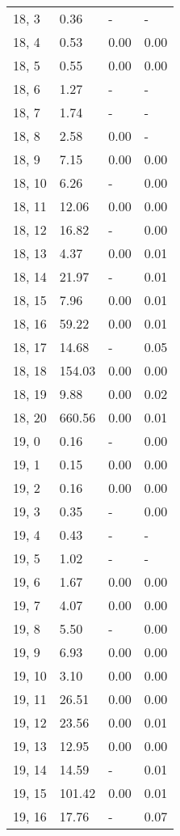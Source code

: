 \begin{table}
\begin{tabular}{llll}
18, 3  &    0.36 &     - &     - \\
18, 4  &    0.53 &  0.00 &  0.00 \\
18, 5  &    0.55 &  0.00 &  0.00 \\
18, 6  &    1.27 &     - &     - \\
18, 7  &    1.74 &     - &     - \\
18, 8  &    2.58 &  0.00 &     - \\
18, 9  &    7.15 &  0.00 &  0.00 \\
18, 10 &    6.26 &     - &  0.00 \\
18, 11 &   12.06 &  0.00 &  0.00 \\
18, 12 &   16.82 &     - &  0.00 \\
18, 13 &    4.37 &  0.00 &  0.01 \\
18, 14 &   21.97 &     - &  0.01 \\
18, 15 &    7.96 &  0.00 &  0.01 \\
18, 16 &   59.22 &  0.00 &  0.01 \\
18, 17 &   14.68 &     - &  0.05 \\
18, 18 &  154.03 &  0.00 &  0.00 \\
18, 19 &    9.88 &  0.00 &  0.02 \\
18, 20 &  660.56 &  0.00 &  0.01 \\
19, 0  &    0.16 &     - &  0.00 \\
19, 1  &    0.15 &  0.00 &  0.00 \\
19, 2  &    0.16 &  0.00 &  0.00 \\
19, 3  &    0.35 &     - &  0.00 \\
19, 4  &    0.43 &     - &     - \\
19, 5  &    1.02 &     - &     - \\
19, 6  &    1.67 &  0.00 &  0.00 \\
19, 7  &    4.07 &  0.00 &  0.00 \\
19, 8  &    5.50 &     - &  0.00 \\
19, 9  &    6.93 &  0.00 &  0.00 \\
19, 10 &    3.10 &  0.00 &  0.00 \\
19, 11 &   26.51 &  0.00 &  0.00 \\
19, 12 &   23.56 &  0.00 &  0.01 \\
19, 13 &   12.95 &  0.00 &  0.00 \\
19, 14 &   14.59 &     - &  0.01 \\
19, 15 &  101.42 &  0.00 &  0.01 \\
19, 16 &   17.76 &     - &  0.07 \\

\end{tabular}
\end{table}
